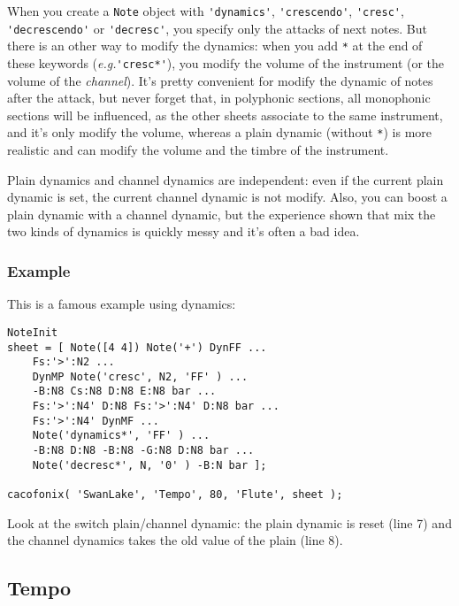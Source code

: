 \documentclass{article}
\newcommand{\note}{\lstinline!Note!\xspace}
\newcommand{\eg}{\emph{e.g.}\xspace}
\begin{document}
When you create a \note object with \lstinline!'dynamics'!, \lstinline!'crescendo'!, \lstinline!'cresc'!, \lstinline!'decrescendo'! or \lstinline!'decresc'!, you specify only the attacks of next notes. But there is an other way to modify the dynamics: when you add \lstinline!*! at the end of these keywords (\eg \lstinline!'cresc*'!), you modify the volume of the instrument (or the volume of the \emph{channel}). It's pretty convenient for modify the dynamic of notes after the attack, but never forget that, in polyphonic sections, all monophonic sections will be influenced, as the other sheets associate to the same instrument, and it's only modify the volume, whereas a plain dynamic (without \lstinline!*!) is more realistic and can modify the volume and the timbre of the instrument.

Plain dynamics and channel dynamics are independent: even if the current plain dynamic is set, the current channel dynamic is not modify. Also, you can boost a plain dynamic with a channel dynamic, but the experience shown that mix the two kinds of dynamics is quickly messy and it's often a bad idea.

\subsubsection{Example}

This is a famous example using dynamics: \\

\begin{lstlisting}
NoteInit
sheet = [ Note([4 4]) Note('+') DynFF ...
	Fs:'>':N2 ...
	DynMP Note('cresc', N2, 'FF' ) ...
	-B:N8 Cs:N8 D:N8 E:N8 bar ...
	Fs:'>':N4' D:N8 Fs:'>':N4' D:N8 bar ...
	Fs:'>':N4' DynMF ...
	Note('dynamics*', 'FF' ) ...
	-B:N8 D:N8 -B:N8 -G:N8 D:N8 bar ...
	Note('decresc*', N, '0' ) -B:N bar ];

cacofonix( 'SwanLake', 'Tempo', 80, 'Flute', sheet );
\end{lstlisting}

Look at the switch plain/channel dynamic: the plain dynamic is reset (line 7) and the channel dynamics takes the old value of the plain (line 8).

\subsection{Tempo}
\label{sec:Tempo}
\end{document}

